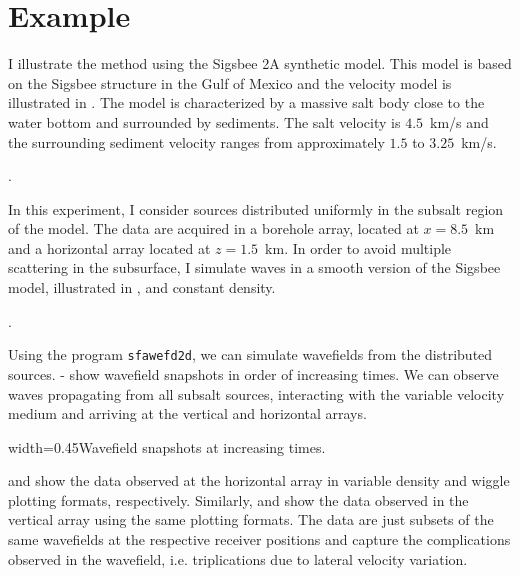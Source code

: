 \section{Example}


I illustrate the method using the Sigsbee 2A synthetic model.  This
model is based on the Sigsbee structure in the Gulf of Mexico and the
velocity model is illustrated in . The model is
characterized by a massive salt body close to the water bottom and
surrounded by sediments. The salt velocity is $4.5$~km/s and the
surrounding sediment velocity ranges from approximately $1.5$ to
$3.25$~km/s.

.

In this experiment, I consider sources distributed uniformly in the
subsalt region of the model. The data are acquired in a borehole
array, located at $x=8.5$~km and a horizontal array located at
$z=1.5$~km. In order to avoid multiple scattering in the subsurface, I
simulate waves in a smooth version of the Sigsbee model, illustrated in
, and constant density.

.

Using the \mg program \texttt{sfawefd2d}, we can simulate wavefields
from the distributed sources. - show
wavefield snapshots in order of increasing times. We can observe waves
propagating from all subsalt sources, interacting with the variable
velocity medium and arriving at the vertical and horizontal arrays.

{width=0.45\textwidth}{Wavefield snapshots at increasing times.}

 and  show the data observed at the horizontal
array in variable density and wiggle plotting formats,
respectively. Similarly,  and  show the data
observed in the vertical array using the same plotting formats. The
data are just subsets of the same wavefields at the respective
receiver positions and capture the complications observed in the
wavefield, i.e. triplications due to lateral velocity variation.



